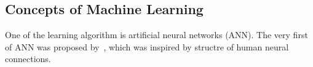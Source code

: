 \subsection{Concepts of Machine Learning}
One of the learning algorithm is artificial neural networks (ANN). The very first of ANN was proposed by~\citet{McCulloch_1943}, which was inspired by structre of human neural connections. 